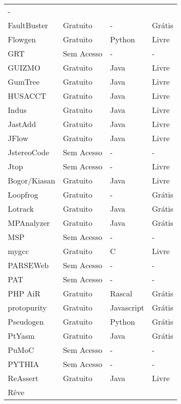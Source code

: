 \begin{longtable}{l l l l}
      - \\
    FaultBuster &
      Gratuito &
      - &
      Grátis \\
    Flowgen &
      Gratuito &
      Python &
      Livre \\
    GRT &
      Sem Acesso &
      - &
      - \\
    GUIZMO &
      Gratuito &
      Java &
      Livre \\
    GumTree &
      Gratuito &
      Java &
      Livre \\
    HUSACCT &
      Gratuito &
      Java &
      Livre \\
    Indus &
      Gratuito &
      Java &
      Livre \\
    JastAdd &
      Gratuito &
      Java &
      Livre \\
    JFlow &
      Gratuito &
      Java &
      Livre \\
    JstereoCode &
      Sem Acesso &
      - &
      - \\
    Jtop &
      Sem Acesso &
      - &
      Livre \\
    Bogor/Kiasan &
      Gratuito &
      Java &
      Livre \\
    Loopfrog &
      Gratuito &
      - &
      Grátis \\
    Lotrack &
      Gratuito &
      Java &
      Grátis \\
    MPAnalyzer &
      Gratuito &
      Java &
      Grátis \\
    MSP &
      Sem Acesso &
      - &
      - \\
    mygcc &
      Gratuito &
      C &
      Livre \\
    PARSEWeb &
      Sem Acesso &
      - &
      - \\
    PAT &
      Sem Acesso &
      - &
      - \\
    PHP AiR &
      Gratuito &
      Rascal &
      Grátis \\
    protopurity &
      Gratuito &
      Javascript &
      Grátis \\
    Pseudogen &
      Gratuito &
      Python &
      Grátis \\
    PtYasm &
      Gratuito &
      Java &
      Grátis \\
    PuMoC &
      Sem Acesso &
      - &
      - \\
    PYTHIA &
      Sem Acesso &
      - &
      - \\
    ReAssert &
      Gratuito &
      Java &
      Livre \\
    Rêve &

\end{longtable}
